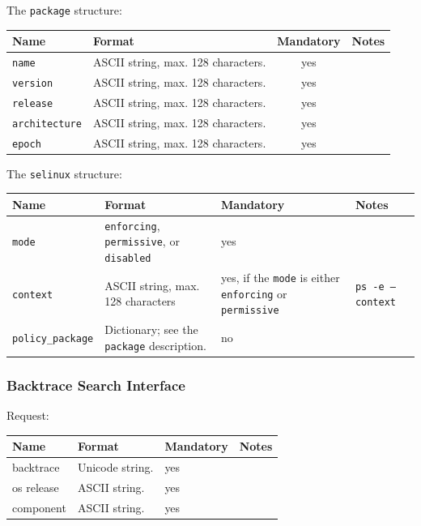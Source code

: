 \documentclass{article}
\begin{document}
The \texttt{package} structure:

\begin{flushleft}
\begin{tabular}{|l|p{5cm}|c|p{5cm}|}
\hline
Name & Format & Mandatory & Notes \\ \hline
\texttt{name} & ASCII string, max. 128 characters. & yes & \\
\texttt{version} & ASCII string, max. 128 characters. & yes & \\
\texttt{release} & ASCII string, max. 128 characters. & yes & \\
\texttt{architecture} & ASCII string, max. 128 characters. & yes & \\
\texttt{epoch} & ASCII string, max. 128 characters. & yes & \\
\hline
\end{tabular}
\end{flushleft}

The \texttt{selinux} structure:

\begin{flushleft}
\begin{tabular}{|l|p{5cm}|p{3cm}|p{5cm}|}
\hline
Name & Format & Mandatory & Notes \\ \hline
\texttt{mode} & \texttt{enforcing}, \texttt{permissive}, or \texttt{disabled} & yes & \\
\texttt{context} & ASCII string, max. 128 characters & yes, if the \texttt{mode} is either \texttt{enforcing} or \texttt{permissive} & \texttt{ps -e --context} \\
\texttt{policy\_package} & Dictionary; see the \texttt{package} description. & no & \\
\hline
\end{tabular}
\end{flushleft}

\cleardoublepage
\subsubsection{Backtrace Search Interface}

Request:

\begin{flushleft}
\begin{tabular}{|l|p{5cm}|p{3cm}|p{5cm}|}
\hline
Name       & Format          & Mandatory & Notes \\
\hline
backtrace  & Unicode string. & yes       & \\
os release & ASCII string.   & yes       & \\
component  & ASCII string.   & yes       & \\
\hline
\end{tabular}
\end{flushleft}
\end{document}
